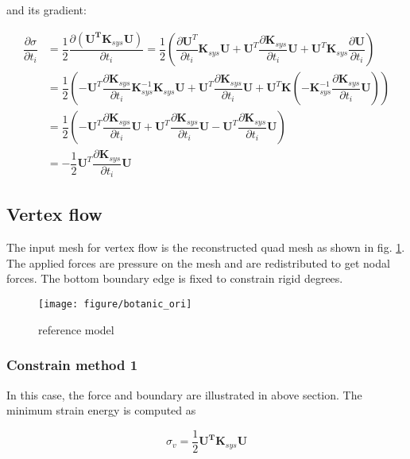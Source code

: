 and its gradient:

\begin{align*}
\dfrac{\partial \sigma}{\partial t_i} &= \dfrac{1}{2} \dfrac{\partial \left( \mathbf{U^T} \mathbf{K}_{sys} \mathbf{U} \right) }{\partial t_i} = \dfrac{1}{2} \left( \dfrac{\partial \mathbf{U}^T}{\partial t_i} \mathbf{K}_{sys} \mathbf{U} + \mathbf{U}^T \dfrac{\partial \mathbf{K}_{sys}}{\partial t_i} \mathbf{U} + \mathbf{U}^T \mathbf{K}_{sys} \dfrac{\partial \mathbf{U}}{\partial t_i} \right) \\
&= \dfrac{1}{2} \left(  -\mathbf{U}^T \dfrac{\partial \mathbf{K}_{sys}}{\partial t_i} \mathbf{K}_{sys}^{-1} \mathbf{K}_{sys} \mathbf{U} + \mathbf{U}^T \dfrac{\partial \mathbf{K}_{sys}}{\partial t_i} \mathbf{U} + \mathbf{U}^T \mathbf{K} \left( -\mathbf{K}_{sys}^{-1} \dfrac{\partial \mathbf{K}_{sys}}{\partial t_i} \mathbf{U} \right)  \right)  \\
&= \dfrac{1}{2} \left( -\mathbf{U}^T \dfrac{\partial \mathbf{K}_{sys}}{\partial t_i} \mathbf{U} + \mathbf{U}^T \dfrac{\partial \mathbf{K}_{sys}}{\partial t_i} \mathbf{U} -\mathbf{U}^T \dfrac{\partial \mathbf{K}_{sys}}{\partial t_i} \mathbf{U}  \right)  \\
&= -\dfrac{1}{2} \mathbf{U}^T \dfrac{\partial \mathbf{K}_{sys}}{\partial t_i} \mathbf{U}
\end{align*}

\subsection{Vertex flow}
The input mesh for vertex flow is the reconstructed quad mesh as shown in fig. \ref{fig:botanicori1}. The applied forces are pressure on the mesh and are redistributed to get nodal forces. The bottom boundary edge is fixed to constrain rigid degrees.

\begin{figure}[h!]
\centering
\texttt{[image: figure/botanic\_ori]}
\caption{reference model}
\label{fig:botanicori1}
\end{figure}

\subsubsection{Constrain method 1}
In this case, the force and boundary are illustrated in above section. The minimum strain energy is computed as

\begin{equation*}
\sigma_v = \dfrac{1}{2} \mathbf{U^T} \mathbf{K}_{sys} \mathbf{U}
\end{equation*}

